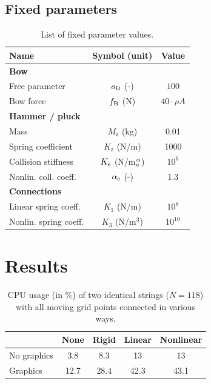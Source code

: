 \documentclass{article}
\begin{document}
\subsection{Fixed parameters}
\begin{table}[h]\label{tab:parameters}
\begin{center}
\begin{tabular}{|l|c|c|}
    \hline
    Name & Symbol (unit) & Value\\ \hline
    \multicolumn{3}{|l|}{\bf Bow}\\ \hline
    Free parameter & $a_{\text{B}}$ (-) & $100$\\
    Bow force & $f_{\text{B}}$ (N) & $40 \cdot \rho A$\\\hline
    \multicolumn{3}{|l|}{\bf Hammer / pluck}\\ \hline
    Mass & $M_\text{z}$ (kg) & 0.01\\
    Spring coefficient & $K_\text{z}$ (N/m) & 1000\\
    Collision stiffness& $K_{\text{e}}$ (N/m$^\alpha_{\text{e}}$) & $10^6$\\
    Nonlin. coll. coeff. & $\alpha_{\text{e}}$ (-) & 1.3\\\hline
    \multicolumn{3}{|l|}{\bf Connections}\\ \hline
    Linear spring coeff. & $K_1$ (N/m)  & $10^8$ \\
    Nonlin. spring coeff. & $K_3$ (N/m$^3$)  & $10^{10}$
    \\\hline
\end{tabular}
\caption{List of fixed parameter values.}
\end{center}
\end{table}
\section{Results}

\begin{table}[]
    \centering
    \begin{tabular}{|l|c|c|c|c|}
        \hline  & None & Rigid & Linear & Nonlinear \\\hline
        No graphics & 3.8 & 8.3 & 13 & 13\\
        Graphics & 12.7 & 28.4 & 42.3 & 43.1\\\hline
    \end{tabular}
    \caption{CPU usage (in \%) of two identical strings ($N=118$) with all moving grid points connected in various ways.}
    \label{tab:CPU}
\end{table}
\end{document}
